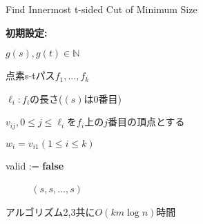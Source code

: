 \documentclass{jarticle}
\begin{document}
\begin{algorithm}[H]
  \caption{Find Innermost t-sided Cut of Minimum Size} 
  \textbf{初期設定:} \par
  $g(s),g(t)\in \mathbb{N}$ \par
  点素s-tパス$f_1,...,f_k$ \par
  $\ell_i:f_i$の長さ($(s)$は0番目) \par
  $v_{ij},0 \leq j \leq \ell_i$を$f_i$上の$j$番目の頂点とする \par
  $w_i=v_{i1}(1\leq i \leq k)$ \par
  valid := \textbf{false} \par 
  {\setlength{\baselineskip}{10pt}
  \begin{algorithmic}[1]
       
       
           
           
          \Else
          \EndIf　
          \EndWhile　
    \EndFor
    \Else
     $(s,s,...,s)$
    \EndIf
  \end{algorithmic}
  }
\end{algorithm}

アルゴリズム2,3共に$O(km\log n)$時間
\end{document}
